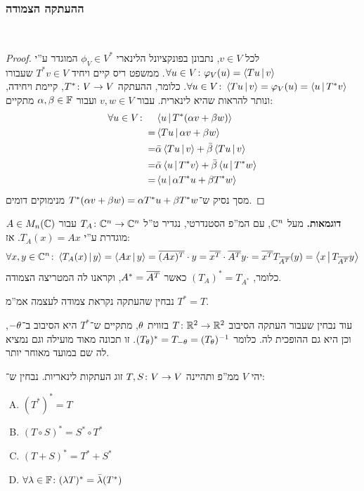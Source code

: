 \documentclass[name=רשימות אלגברה לינארית 2א]{../../../tex/classes/megasumPreamble}
\begin{document}
	\subsubsection{ההעתקה הצמודה}\ 
	
	\begin{proof}
		לכל $v \in V$, נתבונן בפונקציונל הלינארי $\phi_V \in V^*$ המוגדר ע''י $\forall u \in V \colon \varphi_V(u) = \left \langle Tu \,\middle|\, v \right \rangle$. ממשפט ריס קיים ויחיד $T^*v \in V$ שעבורו $\forall u \in V \colon \left \langle Tu \,\middle|\, v \right \rangle = \varphi_V(u) = \left \langle u \,\middle|\, T^*v \right \rangle$. כלומר, ההעתקה $T^* \colon V \to V$, קיימת ויחידה, ונותר להראות שהיא לינארית. עבור $v, w \in V$ ועבור $\alpha, \beta \in \mathbb{F}$ מתקיים: 
		\begin{align*}
			\forall u \in V \colon \quad & \left \langle u \,\middle|\, T^* (\alpha v + \beta w) \right \rangle \\
			= &\left \langle Tu \,\middle|\, \alpha v + \beta w \right \rangle \\
			= &\bar {\alpha} \left \langle Tu \,\middle|\, v \right \rangle + \bar {\beta} \left \langle Tu \,\middle|\, v \right \rangle \\ 
			= &\bar {\alpha} \left \langle u \,\middle|\, T^* v \right \rangle + \bar {\beta} \left \langle u \,\middle|\, T^*w \right \rangle \\
			= &\left \langle u \,\middle|\, \alpha T^*u + \beta T^*w \right \rangle
		\end{align*}
		מסך נסיק ש־$T^*(\alpha v + \beta w) = \alpha T^* u + \beta T^* w$ מנימוקים דומים. 
	\end{proof}
	
	
	\textbf{דוגמאות. }
	מעל $\mathbb{C}^n$, עם המ''פ הסטנדרטי, נגדיר ט''ל $T_A \colon \mathbb{C}^n \to \mathbb{C}^n$ עבור $A \in M_n(\mathbb{C})$ מוגדרת ע''י $T_A(x) = Ax$. אז: 
	\[ \forall x, y \in \mathbb{C}^n \colon \left \langle T_A(x) \,\middle|\, y \right \rangle = \left \langle Ax \,\middle|\, y \right \rangle = \overline{(Ax)^T} \cdot y = \overline{x^T}\cdot\overline{A^T}y\cdot = \overline{x^T}T_{\overline{A^T}}(y) = \left \langle x \,\middle|\, T_{\overline{A^T}}y \right \rangle \]
	כלומר, $(T_A)^* = T_{A^*}$ כאשר $A^* = \overline{A^T}$, וקראנו לה המטריצה הצמודה. 
	
	נבחין שהעתקה נקראת צמודה לעצמה אמ''מ $T^* = T$. 
	
	עוד נבחין שעבור העתקה הסיבוב $T \colon \mathbb{R}^2 \to \mathbb{R}^2$ בזווית $\theta$, מתקיים ש־$T^*$ היא הסיבוב ב־$-\theta$, וכן היא גם ההופכית לה. כלומר $(T_{\theta})^* = T_{-\theta} = (T_\theta)^{-1}$. זו תכונה מאוד מועילה וגם נמציא לה שם במועד מאוחר יותר. 
	
	\begin{Theorem}
		יהי $V$ ממ''פ ותהיינה $T, S \colon V \to V$ זוג העתקות לינאריות. נבחין ש־: 
		\begin{enumerate}[(A)]
			\item \hfil $(T^*)^* = T$
			\item \hfil $(T \circ S)^* = S^* \circ T^*$
			\item \hfil $(T + S)^* = T^* + S^*$
			\item \hfil $\forall \lambda \in \mathbb{F} \colon (\lambda T)^* = \bar {\lambda} (T^*)$
		\end{enumerate}
	\end{Theorem}
	
\end{document}
